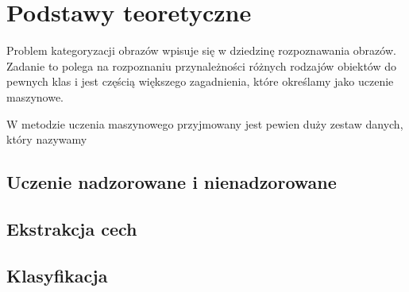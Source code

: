 \chapter{Podstawy teoretyczne}

Problem kategoryzacji obrazów wpisuje się w dziedzinę rozpoznawania obrazów. Zadanie to polega na rozpoznaniu przynależności różnych rodzajów obiektów do pewnych klas i jest częścią większego zagadnienia, które określamy jako uczenie maszynowe.

W metodzie uczenia maszynowego przyjmowany jest pewien duży zestaw danych, który nazywamy 



\section{Uczenie nadzorowane i nienadzorowane}


\section{Ekstrakcja cech}

\section{Klasyfikacja}
